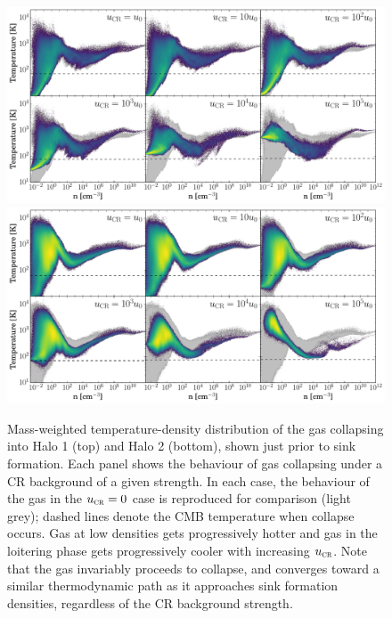 \documentclass{thesis}
\newcommand{\ucr}{\ensuremath{{u}_{\textsc{cr}}}\xspace}
\begin{document}
\begin{figure}
\begin{center}
\includegraphics[width=\columnwidth]{figures/temp/temp}
\includegraphics[width=\columnwidth]{figures/temp/temp_halo2}
\caption{\label{fig:temp}
Mass-weighted temperature-density distribution of the gas collapsing into Halo 1 (top) and Halo 2 (bottom), shown just prior to sink formation. 
Each panel shows the behaviour of gas collapsing under a CR background of a given strength. 
In each case, the behaviour of the gas in the $\ucr=0$ case is reproduced for comparison (light grey); dashed lines denote the CMB temperature when collapse occurs. Gas at low densities gets progressively hotter and gas in the loitering phase gets progressively cooler with increasing $\ucr$. 
Note that the gas invariably proceeds to collapse, and converges toward a similar thermodynamic path as it approaches sink formation densities, regardless of the CR background strength.%
}
\end{center}
\end{figure}
\end{document}
